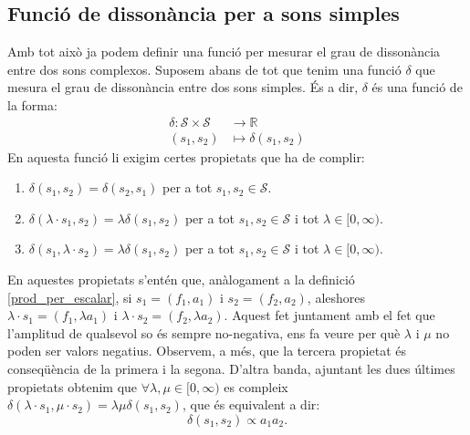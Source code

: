 \documentclass{article}
\theoremstyle{math}
\theoremstyle{TheoremNum}
\newcommand{\0}{\ensuremath{\vb{0}}}
\newcommand{\RR}{\ensuremath{\mathbb{R}}} %
\begin{document}
\subsection{Funció de dissonància per a sons simples}
Amb tot això ja podem definir una funció per mesurar el grau de dissonància entre dos sons complexos. Suposem abans de tot que tenim una funció $\delta$ que mesura el grau de dissonància entre dos sons simples. És a dir, $\delta$ és una funció de la forma:
\begin{align*}
    \delta:\mathcal{S}\times\mathcal{S}&\longrightarrow\RR\\
    (s_1,s_2)&\longmapsto\delta(s_1,s_2)
\end{align*}
En aquesta funció li exigim certes propietats que ha de complir:
\begin{enumerate}[label=$\delta$\arabic*),ref=$\delta$\arabic*]
    \item\label{delta1} $\delta(s_1,s_2)=\delta(s_2,s_1)$ per a tot $s_1,s_2\in\mathcal{S}$.
    \item\label{delta2} $\delta(\lambda\cdot s_1,s_2)=\lambda\delta(s_1,s_2)$ per a tot $s_1,s_2\in\mathcal{S}$ i tot $\lambda\in[0,\infty)$.
    \item\label{delta3} $\delta(s_1,\lambda\cdot s_2)=\lambda\delta(s_1,s_2)$ per a tot $s_1,s_2\in\mathcal{S}$ i tot $\lambda\in[0,\infty)$.\par
\end{enumerate}
En aquestes propietats s'entén que, anàlogament a la definició \ref{prod_per_escalar}, si $s_1=(f_1,a_1)$ i $s_2=(f_2,a_2)$, aleshores $\lambda\cdot s_1=(f_1,\lambda a_1)$ i $\lambda\cdot s_2=(f_2,\lambda a_2)$. Aquest fet juntament amb el fet que l'amplitud de qualsevol so és sempre no-negativa, ens fa veure per què $\lambda$ i $\mu$ no poden ser valors negatius. Observem, a més, que la tercera propietat és conseqüència de la primera i la segona. D'altra banda, ajuntant les dues últimes propietats obtenim que $\forall\lambda,\mu\in[0,\infty)$ es compleix $\delta(\lambda\cdot s_1,\mu\cdot s_2)=\lambda\mu\delta(s_1,s_2)$, que és equivalent a dir: $$\delta(s_1,s_2)\propto a_1a_2.$$
\end{document}
